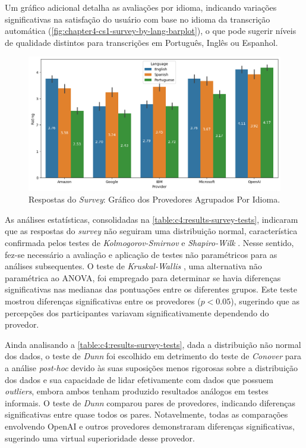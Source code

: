 Um gráfico adicional detalha as avaliações por idioma, indicando variações significativas na satisfação do usuário com base no idioma da transcrição automática (\autoref{fig:chapter4-cs1-survey-by-lang-barplot}), o que pode sugerir níveis de qualidade distintos para transcrições em Português, Inglês ou Espanhol.

\begin{figure}[htb]
\centering
\caption{Respostas do \textit{Survey}: Gráfico dos Provedores Agrupados Por Idioma.}
\label{fig:chapter4-cs1-survey-by-lang-barplot}
\includegraphics[width=.96\textwidth]{images/chapter4-cs1-survey-by-lang-barplot.png}
\end{figure}

As análises estatísticas, consolidadas na \autoref{table:c4:results-survey-tests}, indicaram que as respostas do \textit{survey} não seguiram uma distribuição normal, característica confirmada pelos testes de \textit{Kolmogorov-Smirnov} \cite{Kolmogorov1933,Smirnov1948} e \textit{Shapiro-Wilk} \cite{Shapiro1965}. Nesse sentido, fez-se necessário a avaliação e aplicação de testes não paramétricos para as análises subsequentes. O teste de \textit{Kruskal-Wallis} \cite{Kruskal1952}, uma alternativa não paramétrica ao ANOVA, foi empregado para determinar se havia diferenças significativas nas medianas das pontuações entre os diferentes grupos. Este teste mostrou diferenças significativas entre os provedores (\ensuremath{p < 0.05}), sugerindo que as percepções dos participantes variavam significativamente dependendo do provedor.

Ainda analisando a \autoref{table:c4:results-survey-tests}, dada a distribuição não normal dos dados, o teste de \textit{Dunn} \cite{Dunn1964} foi escolhido em detrimento do teste de \textit{Conover} \cite{Conover1999} para a análise \textit{post-hoc} devido às suas suposições menos rigorosas sobre a distribuição dos dados e sua capacidade de lidar efetivamente com dados que possuem \textit{outliers}, embora ambos tenham produzido resultados análogos em testes informais. O teste de \textit{Dunn} comparou pares de provedores, indicando diferenças significativas entre quase todos os pares. Notavelmente, todas as comparações envolvendo OpenAI e outros provedores demonstraram diferenças significativas, sugerindo uma virtual superioridade desse provedor.

